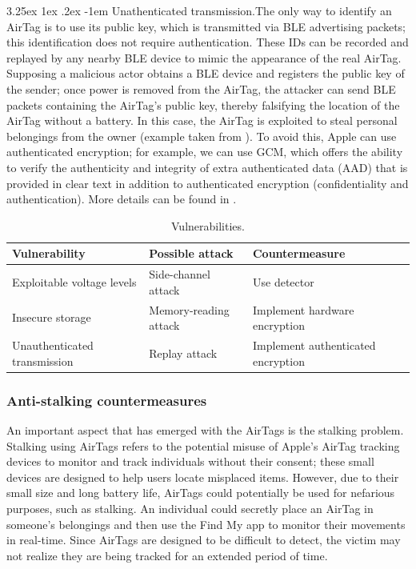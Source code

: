 \documentclass[english]{article}
\makeatletter
\renewcommand\paragraph{\@startsection{paragraph}{5}{\z@}%
  {3.25ex \@plus1ex \@minus.2ex}%
  {-1em}%
  {\normalfont\normalsize\bfseries}}
\makeatother
\begin{document}
\paragraph{Unathenticated transmission.}The only way to identify an AirTag is to use its public key, which is transmitted via BLE advertising packets; this identification does not require authentication. These IDs can be recorded and replayed by any nearby BLE device to mimic the appearance of the real AirTag. Supposing a malicious actor obtains a BLE device and registers the public key of the sender; once power is removed from the AirTag, the attacker can send BLE packets containing the AirTag's public key, thereby falsifying the location of the AirTag without a battery. In this case, the AirTag is exploited to steal personal belongings from the owner (example taken from \cite{reverse}). To avoid this, Apple can use authenticated encryption; for example, we can use GCM, which offers the ability to verify the authenticity and integrity of extra authenticated data (AAD) that is provided in clear text in addition to authenticated encryption (confidentiality and authentication). More details can be found in \cite{gcm}.

\begin{table}[h] 
  \caption{Vulnerabilities.}
  \centering
  \begin{tabularx}{\textwidth}{|X|X|X|}
    \hline
    \textbf{Vulnerability}      & \textbf{Possible attack} & \textbf{Countermeasure}             \\ \hline
    Exploitable voltage levels  & Side-channel attack      & Use detector         \\ \hline
    Insecure storage            & Memory-reading attack    & Implement hardware encryption \\ \hline
    Unauthenticated transmission & Replay attack            & Implement authenticated encryption                     \\ \hline
  \end{tabularx}
  \label{vuln}
\end{table}

\subsubsection{Anti-stalking countermeasures}\label{countermeasures}
An important aspect that has emerged with the AirTags is the stalking problem. Stalking using AirTags refers to the potential misuse of Apple's AirTag tracking devices to monitor and track individuals without their consent; these small devices are designed to help users locate misplaced items. However, due to their small size and long battery life, AirTags could potentially be used for nefarious purposes, such as stalking. An individual could secretly place an AirTag in someone's belongings and then use the Find My app to monitor their movements in real-time. Since AirTags are designed to be difficult to detect, the victim may not realize they are being tracked for an extended period of time.
\end{document}
